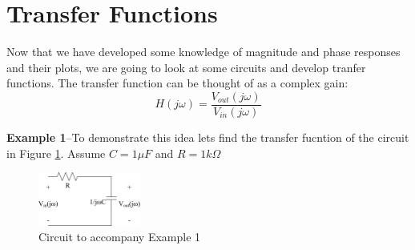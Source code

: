 \documentclass{handout}
\begin{document}
\section{Transfer Functions}
Now that we have developed some knowledge of magnitude and phase responses and their plots, we are going to look at some circuits and develop tranfer functions.  The transfer function can be thought of as a complex gain:
\[
H(j\omega)=\frac{V_{out}(j\omega)}{V_{in}(j\omega)}
\]

\textbf{Example 1}--To demonstrate this idea lets find the transfer fucntion of the circuit in Figure \ref{fig: TransferFunction}.  Assume $C = 1\mu F$  and $R = 1k\Omega$
\begin{figure} [h!]
\centering
\includegraphics[width=0.3\textwidth]{TransferFunction.jpg}
\caption{Circuit to accompany Example 1}
\label{fig: TransferFunction}
\end{figure}



\newpage
\clearpage
\pagebreak
\end{document}
